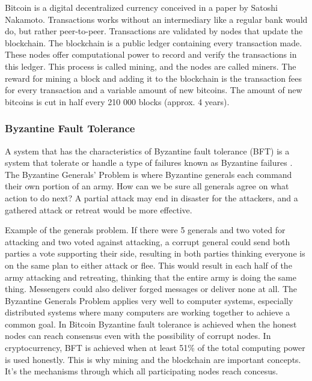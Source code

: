 \documentclass[12pt]{article}
\begin{document}
Bitcoin is a digital decentralized currency conceived in a paper by Satoshi Nakamoto\cite{nakamoto2009bitcoin}. Transactions works without an intermediary like a regular bank would do, but rather peer-to-peer. Transactions are validated by nodes that update the blockchain. The blockchain is a public ledger containing every transaction made. These nodes offer computational power to record and verify the transactions in this ledger. This process is called mining, and the nodes are called miners. The reward for mining a block and adding it to the blockchain is the transaction fees for every transaction and a variable amount of new bitcoins. The amount of new bitcoins is cut in half every 210 000 blocks (approx. 4 years).

\subsubsection{Byzantine Fault Tolerance}

A system that has the characteristics of Byzantine fault tolerance (BFT) is a system that tolerate or handle a type of failures known as Byzantine failures \cite{lamport1982byzantine}. The Byzantine Generals' Problem is where Byzantine generals each command their own portion of an army. How can we be sure all generals agree on what action to do next? A partial attack may end in disaster for the attackers, and a gathered attack or retreat would be more effective.

Example of the generals problem. If there were 5 generals and two voted for attacking and two voted against attacking, a corrupt general could send both parties a vote supporting their side, resulting in both parties thinking everyone is on the same plan to either attack or flee. This would result in each half of the army attacking and retreating, thinking that the entire army is doing the same thing.  Messengers could also deliver forged messages or deliver none at all. The Byzantine Generals Problem applies very well to computer systems, especially distributed systems where many computers are working together to achieve a common goal. In Bitcoin Byzantine fault tolerance is achieved when the honest nodes can reach consensus even with the possibility of corrupt nodes. In cryptocurrency, BFT is achieved when at least 51\% of the total computing power is used honestly\cite{nakamoto2009bitcoin}. This is why mining and the blockchain are important concepts. It's the mechanisms through which all participating nodes reach concesus.
 
\end{document}
